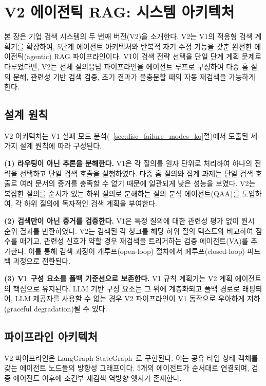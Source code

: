 \chapter{V2 에이전틱 RAG: 시스템 아키텍처}
\label{chap:v2_methodology_ko}

본 장은 기업 검색 시스템의 두 번째 버전(V2)을 소개한다. V2는 V1의 적응형 검색 계획기를 확장하여, 5단계 에이전트 아키텍처와 반복적 자기 수정 기능을 갖춘 완전한 에이전틱(agentic) RAG 파이프라인이다. V1이 검색 전략 선택을 단일 단계 계획 문제로 다루었다면, V2는 전체 질의응답 파이프라인을 에이전트 루프로 구성하여 다중 홉 질의 분해, 관련성 기반 검색 검증, 초기 결과가 불충분할 때의 자동 재검색을 가능하게 한다.

\section{설계 원칙}
\label{sec:v2_design_ko}

V2 아키텍처는 V1 실패 모드 분석(~\ref{sec:disc_failure_modes_ko}절)에서 도출된 세 가지 설계 원칙에 따라 구성된다.

\textbf{(1) 라우팅이 아닌 추론을 분해한다.} V1은 각 질의를 원자 단위로 처리하여 하나의 전략을 선택하고 단일 검색 호출을 실행하였다. 다중 홉 질의와 집계 과제는 단일 검색 호출로 여러 문서의 증거를 충족할 수 없기 때문에 일관되게 낮은 성능을 보였다. V2는 복잡한 질의를 순서가 있는 하위 질의로 분해하는 질의 분석 에이전트(QAA)를 도입하여, 각 하위 질의에 독자적인 검색 계획을 부여한다.

\textbf{(2) 검색만이 아닌 증거를 검증한다.} V1은 특정 질의에 대한 관련성 평가 없이 원시 순위 결과를 반환하였다. V2는 검색된 각 청크를 해당 하위 질의 텍스트와 비교하여 점수를 매기고, 관련성 신호가 약할 경우 재검색을 트리거하는 검증 에이전트(VA)를 추가한다. 이를 통해 검색 과정이 개루프(open-loop) 절차에서 폐루프(closed-loop) 피드백 과정으로 전환된다.

\textbf{(3) V1 구성 요소를 폴백 기준선으로 보존한다.} V1 규칙 계획기는 V2 계획 에이전트의 핵심으로 유지된다. LLM 기반 구성 요소는 그 위에 계층화되고 폴백 경로로 래핑되어, LLM 제공자를 사용할 수 없는 경우 V2 파이프라인이 V1 동작으로 우아하게 저하(graceful degradation)될 수 있다.

\section{파이프라인 아키텍처}
\label{sec:v2_pipeline_ko}

V2 파이프라인은 LangGraph StateGraph~\citep{langgraph2024}로 구현된다. 이는 공유 타입 상태 객체를 갖는 에이전트 노드들의 방향성 그래프이다. 5개의 에이전트가 순서대로 연결되며, 검증 에이전트 이후에 조건부 재검색 역방향 엣지가 존재한다.

